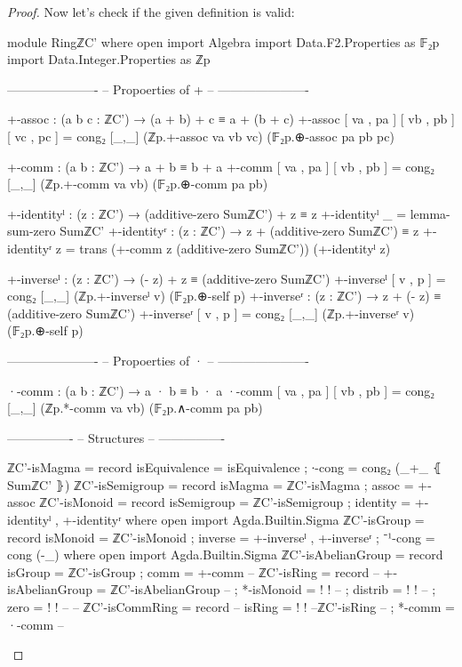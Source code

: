 \documentclass[a4paper]{report}
\theoremstyle{definition}
\begin{document}
\begin{proof}
  Now let's check if the given definition is valid:
  \begin{code}
module RingℤC' where
  open import Algebra
  import Data.F2.Properties as 𝔽₂p
  import Data.Integer.Properties as ℤp

  ----------------------
  -- Propoerties of + --
  ----------------------

  +-assoc : (a b c : ℤC') → (a + b) + c ≡ a + (b + c)
  +-assoc [ va , pa ] [ vb , pb ] [ vc , pc ] = cong₂ [_,_] (ℤp.+-assoc va vb vc) (𝔽₂p.⊕-assoc pa pb pc)

  +-comm : (a b : ℤC') → a + b ≡ b + a
  +-comm [ va , pa ] [ vb , pb ] = cong₂ [_,_] (ℤp.+-comm va vb) (𝔽₂p.⊕-comm pa pb)

  +-identityˡ : (z : ℤC') → (additive-zero SumℤC') + z ≡ z
  +-identityˡ _ = lemma-sum-zero SumℤC'
  +-identityʳ : (z : ℤC') → z + (additive-zero SumℤC') ≡ z
  +-identityʳ z = trans (+-comm z (additive-zero SumℤC')) (+-identityˡ z)

  +-inverseˡ : (z : ℤC') → (- z) + z ≡ (additive-zero SumℤC')
  +-inverseˡ [ v , p ] = cong₂ [_,_] (ℤp.+-inverseˡ v) (𝔽₂p.⊕-self p)
  +-inverseʳ : (z : ℤC') → z + (- z) ≡ (additive-zero SumℤC')
  +-inverseʳ [ v , p ] = cong₂ [_,_] (ℤp.+-inverseʳ v) (𝔽₂p.⊕-self p)

  ----------------------
  -- Propoerties of · --
  ----------------------

  ·-comm : (a b : ℤC') → a · b ≡ b · a
  ·-comm [ va , pa ] [ vb , pb ] = cong₂ [_,_] (ℤp.*-comm va vb) (𝔽₂p.∧-comm pa pb)

  ----------------
  -- Structures --
  ----------------

  ℤC'-isMagma = record
    { isEquivalence = isEquivalence
    ; ∙-cong        =  cong₂ (_+_ ⦃ SumℤC' ⦄)
    }
  ℤC'-isSemigroup = record
    { isMagma = ℤC'-isMagma
    ; assoc   = +-assoc
    }
  ℤC'-isMonoid = record
    { isSemigroup = ℤC'-isSemigroup
    ; identity    = +-identityˡ , +-identityʳ
    }
    where open import Agda.Builtin.Sigma
  ℤC'-isGroup = record
    { isMonoid = ℤC'-isMonoid
    ; inverse  = +-inverseˡ , +-inverseʳ
    ; ⁻¹-cong  = cong (-_)
    }
    where open import Agda.Builtin.Sigma
  ℤC'-isAbelianGroup = record
    { isGroup = ℤC'-isGroup
    ; comm    = +-comm
    }
  -- ℤC'-isRing = record
  --   { +-isAbelianGroup = ℤC'-isAbelianGroup
  --   ; *-isMonoid       = {!   !}
  --   ; distrib          = {!   !}
  --   ; zero             = {!   !}
  --   }
  -- ℤC'-isCommRing = record
  --   { isRing = {!   !} --ℤC'-isRing
  --   ; *-comm = ·-comm
  --   }

  \end{code}
\end{proof}
\end{document}
